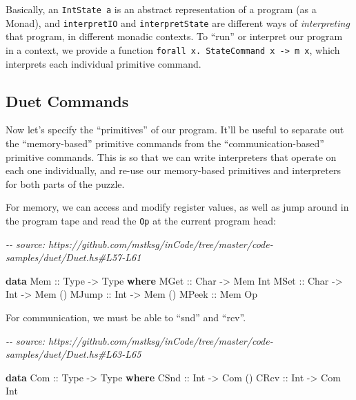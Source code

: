 \documentclass[]{article}
\newenvironment{Shaded}{}{}
\newcommand{\CommentTok}[1]{\textcolor[rgb]{0.38,0.63,0.69}{\textit{#1}}}
\newcommand{\DataTypeTok}[1]{\textcolor[rgb]{0.56,0.13,0.00}{#1}}
\newcommand{\KeywordTok}[1]{\textcolor[rgb]{0.00,0.44,0.13}{\textbf{#1}}}
\newcommand{\NormalTok}[1]{#1}
\newcommand{\OtherTok}[1]{\textcolor[rgb]{0.00,0.44,0.13}{#1}}
\begin{document}
Basically, an \texttt{IntState\ a} is an abstract representation of a program
(as a Monad), and \texttt{interpretIO} and \texttt{interpretState} are different
ways of \emph{interpreting} that program, in different monadic contexts. To
``run'' or interpret our program in a context, we provide a function
\texttt{forall\ x.\ StateCommand\ x\ -\textgreater{}\ m\ x}, which interprets
each individual primitive command.

\subsection{Duet Commands}\label{duet-commands}

Now let's specify the ``primitives'' of our program. It'll be useful to separate
out the ``memory-based'' primitive commands from the ``communication-based''
primitive commands. This is so that we can write interpreters that operate on
each one individually, and re-use our memory-based primitives and interpreters
for both parts of the puzzle.

For memory, we can access and modify register values, as well as jump around in
the program tape and read the \texttt{Op} at the current program head:

\begin{Shaded}
\begin{Highlighting}[]
\CommentTok{{-}{-} source: https://github.com/mstksg/inCode/tree/master/code{-}samples/duet/Duet.hs\#L57{-}L61}

\KeywordTok{data} \DataTypeTok{Mem}\OtherTok{ ::} \DataTypeTok{Type} \OtherTok{{-}\textgreater{}} \DataTypeTok{Type} \KeywordTok{where}
    \DataTypeTok{MGet}\OtherTok{  ::} \DataTypeTok{Char} \OtherTok{{-}\textgreater{}} \DataTypeTok{Mem} \DataTypeTok{Int}
    \DataTypeTok{MSet}\OtherTok{  ::} \DataTypeTok{Char} \OtherTok{{-}\textgreater{}} \DataTypeTok{Int} \OtherTok{{-}\textgreater{}} \DataTypeTok{Mem}\NormalTok{ ()}
    \DataTypeTok{MJump}\OtherTok{ ::} \DataTypeTok{Int}  \OtherTok{{-}\textgreater{}} \DataTypeTok{Mem}\NormalTok{ ()}
    \DataTypeTok{MPeek}\OtherTok{ ::} \DataTypeTok{Mem} \DataTypeTok{Op}
\end{Highlighting}
\end{Shaded}

For communication, we must be able to ``snd'' and ``rcv''.

\begin{Shaded}
\begin{Highlighting}[]
\CommentTok{{-}{-} source: https://github.com/mstksg/inCode/tree/master/code{-}samples/duet/Duet.hs\#L63{-}L65}

\KeywordTok{data} \DataTypeTok{Com}\OtherTok{ ::} \DataTypeTok{Type} \OtherTok{{-}\textgreater{}} \DataTypeTok{Type} \KeywordTok{where}
    \DataTypeTok{CSnd}\OtherTok{ ::} \DataTypeTok{Int} \OtherTok{{-}\textgreater{}} \DataTypeTok{Com}\NormalTok{ ()}
    \DataTypeTok{CRcv}\OtherTok{ ::} \DataTypeTok{Int} \OtherTok{{-}\textgreater{}} \DataTypeTok{Com} \DataTypeTok{Int}
\end{Highlighting}
\end{Shaded}
\end{document}
